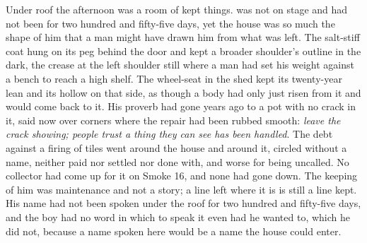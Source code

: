 Under  roof the afternoon was a room of kept things.  was not on stage and had not been for two hundred and fifty-five days, yet the house was so much the shape of him that a man might have drawn him from what was left. The salt-stiff coat hung on its peg behind the door and kept a broader shoulder's outline in the dark, the crease at the left shoulder still where a man had set his weight against a bench to reach a high shelf. The wheel-seat in the shed kept its twenty-year lean and its hollow on that side, as though a body had only just risen from it and would come back to it. His proverb had gone years ago to a pot with no crack in it, said now over corners where the repair had been rubbed smooth: \emph{leave the crack showing; people trust a thing they can see has been handled}. The debt against a firing of tiles went around the house and around it, circled without a name, neither paid nor settled nor done with, and worse for being uncalled. No collector had come up  for it on Smoke 16, and none had gone down. The keeping of him was maintenance and not a story; a line left where it is is still a line kept. His name had not been spoken under the roof for two hundred and fifty-five days, and the boy had no word in which to speak it even had he wanted to, which he did not, because a name spoken here would be a name the house could enter.

